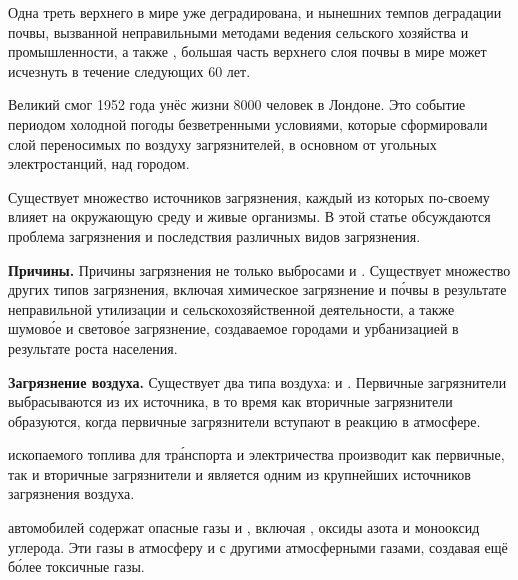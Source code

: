 Одна треть верхнего   в мире уже деградирована, и  нынешних темпов деградации почвы, вызванной неправильными методами ведения сельского хозяйства и промышленности, а также , большая часть верхнего слоя почвы в мире может исчезнуть в течение следующих 60 лет.

Великий смог 1952 года унёс жизни 8000 человек в Лондоне. Это событие  периодом холодной погоды  безветренными условиями, которые сформировали  слой переносимых по воздуху загрязнителей, в основном от угольных электростанций, над городом.

Существует множество источников загрязнения, каждый из которых по-своему влияет на окружающую среду и живые организмы. В этой статье обсуждаются проблема загрязнения и последствия различных видов загрязнения.

\textbf{Причины.} Причины загрязнения не  только выбросами  и . Существует множество других типов загрязнения, включая химическое загрязнение  и п\'{о}чвы в результате неправильной утилизации и сельскохозяйственной деятельности, а также шумов\'{о}е и светов\'{о}е загрязнение, создаваемое городами и урбанизацией в результате роста населения.

\textbf{Загрязнение воздуха.}
Существует два типа  воздуха:  и . Первичные загрязнители выбрасываются  из их источника, в то время как вторичные загрязнители образуются, когда первичные загрязнители вступают в реакцию в атмосфере.

 ископаемого топлива для тр\'{а}нспорта и электричества производит как первичные, так и вторичные загрязнители и является одним из крупнейших источников загрязнения воздуха.

 автомобилей содержат опасные газы и , включая , оксиды азота и монооксид углерода. Эти газы  в атмосферу и  с другими атмосферными газами, создавая ещё б\'{о}лее токсичные газы.

